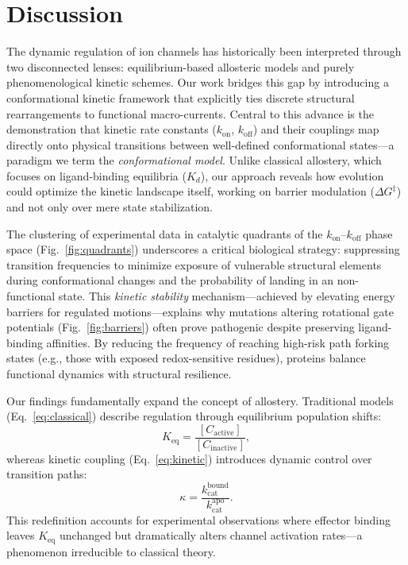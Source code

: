 \documentclass[a4paper,12pt]{article}
\begin{document}
	
	\section{Discussion}
	
	The dynamic regulation of ion channels has historically been interpreted through two disconnected lenses: equilibrium-based allosteric models and purely phenomenological kinetic schemes. Our work bridges this gap by introducing a conformational kinetic framework that explicitly ties discrete structural rearrangements to functional macro-currents. Central to this advance is the demonstration that kinetic rate constants ($k_{\text{on}}$, $k_{\text{off}}$) and their couplings map directly onto physical transitions between well-defined conformational states—a paradigm we term the \textit{conformational model}. Unlike classical allostery, which focuses on ligand-binding equilibria ($K_d$), our approach reveals how evolution could optimize the kinetic landscape itself, working on barrier modulation ($\Delta G^{\ddagger}$) and not only over mere state stabilization. 
	

	
	
	The clustering of experimental data in catalytic quadrants of the $k_{\text{on}}$–$k_{\text{off}}$ phase space (Fig.~\ref{fig:quadrants}) underscores a critical biological strategy: suppressing transition frequencies to minimize exposure of vulnerable structural elements during conformational changes and the probability of landing in an non-functional state. This \textit{kinetic stability} mechanism—achieved by elevating energy barriers for regulated motions—explains why mutations altering rotational gate potentials (Fig.~\ref{fig:barriers}) often prove pathogenic despite preserving ligand-binding affinities. By reducing the frequency of reaching high-risk path forking states (e.g., those with exposed redox-sensitive residues), proteins balance functional dynamics with structural resilience.  
	
	Our findings fundamentally expand the concept of allostery. Traditional models (Eq.~\eqref{eq:classical}) describe regulation through equilibrium population shifts:  
	\begin{equation}
		K_{\text{eq}} = \frac{[C_{\text{active}}]}{[C_{\text{inactive}}]}, \label{eq:classical}
	\end{equation}  
	whereas kinetic coupling (Eq.~\eqref{eq:kinetic}) introduces dynamic control over transition paths:  
	\begin{equation}
		\kappa = \frac{k_{\text{cat}}^{\text{bound}}}{k_{\text{cat}}^{\text{apo}}}. \label{eq:kinetic}
	\end{equation}  
	This redefinition accounts for experimental observations where effector binding leaves $K_{\text{eq}}$ unchanged but dramatically alters channel activation rates—a phenomenon irreducible to classical theory.  
	
\end{document}
